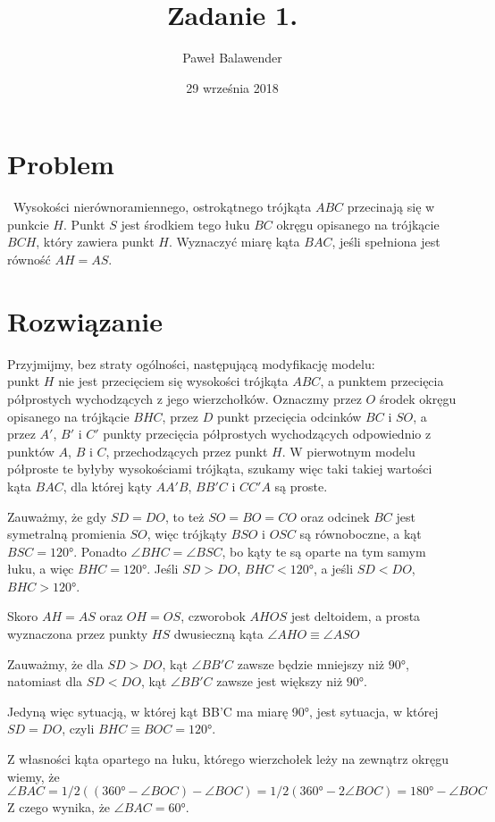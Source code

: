 \documentclass[11pt]{article}
\title{Zadanie 1.}
\date{29 września 2018}
\author{Paweł Balawender}
\begin{document}
\maketitle

\section*{Problem}\
Wysokości nierównoramiennego, ostrokątnego trójkąta $ABC$ przecinają się w punkcie $H$. Punkt $S$ jest środkiem tego łuku $BC$ okręgu opisanego na trójkącie $BCH$, który zawiera punkt $H$. Wyznaczyć miarę kąta $BAC$, jeśli spełniona jest równość $AH = AS$.

\section*{Rozwiązanie}
Przyjmijmy, bez straty ogólności, następującą modyfikację modelu:\\
punkt $H$ nie jest przecięciem się wysokości trójkąta $ABC$, a punktem przecięcia półprostych wychodzących z jego wierzchołków.
Oznaczmy przez $O$ środek okręgu opisanego na trójkącie $BHC$, przez $D$ punkt przecięcia odcinków $BC$ i $SO$, a przez $A'$, $B'$ i $C'$ punkty przecięcia półprostych wychodzących
odpowiednio z punktów $A$, $B$ i $C$, przechodzących przez punkt $H$.
W pierwotnym modelu półproste te byłyby wysokościami trójkąta, szukamy więc taki takiej wartości kąta $BAC$, dla której kąty $AA'B$, $BB'C$ i $CC'A$ są proste.

Zauważmy, że gdy $SD = DO$, to też $SO = BO = CO$ oraz odcinek $BC$ jest symetralną promienia $SO$, więc trójkąty $BSO$ i $OSC$ są równoboczne, a kąt $BSC=\ang{120}$.
Ponadto $\angle BHC = \angle BSC$, bo kąty te są oparte na tym samym łuku, a więc $BHC = \ang{120}$.
Jeśli $SD > DO$, $BHC < \ang{120}$, a jeśli $SD<DO$, $BHC>\ang{120}$.

Skoro $AH=AS$ oraz $OH=OS$, czworobok $AHOS$ jest deltoidem, a prosta wyznaczona przez punkty $HS$ dwusieczną kąta $\angle AHO \equiv \angle ASO$

Zauważmy, że dla $SD>DO$, kąt $\angle BB'C$ zawsze będzie mniejszy niż $\ang{90}$,\\
natomiast dla $SD<DO$, kąt $\angle BB'C$ zawsze jest większy niż $\ang{90}$.

Jedyną więc sytuacją, w której kąt BB'C ma miarę \ang{90}, jest sytuacja, w której $SD=DO$, czyli $BHC \equiv BOC = \ang{120}$.

Z własności kąta opartego na łuku, którego wierzchołek leży na zewnątrz okręgu wiemy, że $\angle BAC = 1/2((\ang{360} - \angle BOC) - \angle BOC) = 1/2(\ang{360} - 2 \angle BOC) = \ang{180} -\angle BOC$
Z czego wynika, że $\angle BAC = \ang{60}$.
\end{document}
